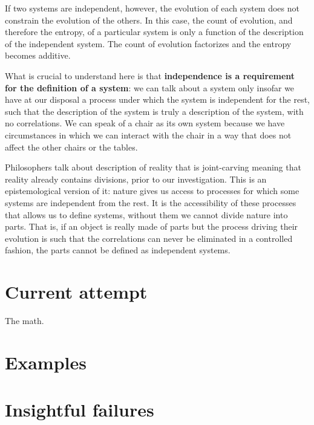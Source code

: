 \documentclass[10pt, onecolumn, longbibliography, nofootinbib]{revtex4-2}
\begin{document}
If two systems are independent, however, the evolution of each system does not constrain the evolution of the others. In this case, the count of evolution, and therefore the entropy, of a particular system is only a function of the description of the independent system. The count of evolution factorizes and the entropy becomes additive.

What is crucial to understand here is that \textbf{independence is a requirement for the definition of a system}: we can talk about a system only insofar we have at our disposal a process under which the system is independent for the rest, such that the description of the system is truly a description of the system, with no correlations. We can speak of a chair as its own system because we have circumstances in which we can interact with the chair in a way that does not affect the other chairs or the tables.

Philosophers talk about description of reality that is joint-carving meaning that reality already contains divisions, prior to our investigation. This is an epistemological version of it: nature gives us access to processes for which some systems are independent from the rest. It is the accessibility of these processes that allows us to define systems, without them we cannot divide nature into parts. That is, if an object is really made of parts but the process driving their evolution is such that the correlations can never be eliminated in a controlled fashion, the parts cannot be defined as independent systems.





\section{Current attempt}

The math.



\section{Examples}

\section{Insightful failures}



\end{document}
